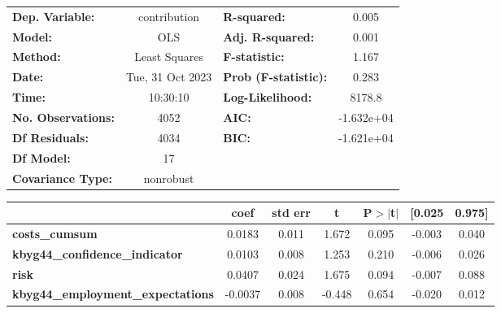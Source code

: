 \begin{center}
\begin{tabular}{lclc}
\toprule
\textbf{Dep. Variable:}                     &   contribution   & \textbf{  R-squared:         } &     0.005   \\
\textbf{Model:}                             &       OLS        & \textbf{  Adj. R-squared:    } &     0.001   \\
\textbf{Method:}                            &  Least Squares   & \textbf{  F-statistic:       } &     1.167   \\
\textbf{Date:}                              & Tue, 31 Oct 2023 & \textbf{  Prob (F-statistic):} &    0.283    \\
\textbf{Time:}                              &     10:30:10     & \textbf{  Log-Likelihood:    } &    8178.8   \\
\textbf{No. Observations:}                  &        4052      & \textbf{  AIC:               } & -1.632e+04  \\
\textbf{Df Residuals:}                      &        4034      & \textbf{  BIC:               } & -1.621e+04  \\
\textbf{Df Model:}                          &          17      & \textbf{                     } &             \\
\textbf{Covariance Type:}                   &    nonrobust     & \textbf{                     } &             \\
\bottomrule
\end{tabular}
\begin{tabular}{lcccccc}
                                            & \textbf{coef} & \textbf{std err} & \textbf{t} & \textbf{P$> |$t$|$} & \textbf{[0.025} & \textbf{0.975]}  \\
\midrule
\textbf{costs\_cumsum}                      &       0.0183  &        0.011     &     1.672  &         0.095        &       -0.003    &        0.040     \\
\textbf{kbyg44\_confidence\_indicator}      &       0.0103  &        0.008     &     1.253  &         0.210        &       -0.006    &        0.026     \\
\textbf{risk}                               &       0.0407  &        0.024     &     1.675  &         0.094        &       -0.007    &        0.088     \\
\textbf{kbyg44\_employment\_expectations}   &      -0.0037  &        0.008     &    -0.448  &         0.654        &       -0.020    &        0.012     \\

\end{tabular}
\end{center}
